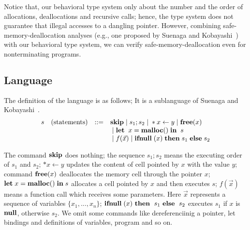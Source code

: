 \documentclass{sigplanconf}
\begin{document}
Notice that, our behavioral type system only about the number and the
order of allocations, deallocations and recursive calls; hence, the
type system does not guarantee that illegal accesses to a dangling
pointer.  However, combining safe-memory-deallocation analyses (e.g.,
one proposed by Suenaga and
Kobayashi~\cite{DBLP:conf/aplas/SuenagaK09}) with our behavioral type
system, we can verify safe-memory-deallocation even for nonterminating
programs.

\subsection{Language}
The definition of the language is as follows; It
is a sublanguage of Suenaga and Kobayashi~\cite{DBLP:conf/aplas/SuenagaK09}.
\[
\begin{array}{rlcl}
  s & (\mbox{statements})&::=&\mathbf{skip} \;|\; s_{1};s_{2} \;|\; *x \leftarrow y \;|\; \mathbf{free} (x) \\
  & & & \;|\; \mathbf{let}\;\; x = \mathbf{malloc()} \; \mathbf{in}\; \; s  \\
  & &  & \;|\; f(\vec{x}) \;|\; \mathbf{ifnull}\;(x) \; \mathbf{then}\; s_{1}\; \mathbf{else}\; s_{2} \\
\end{array}
\]


The command $\mathbf{skip}$ does nothing; the sequence $s_{1};s_{2}$ means the
executing order of $s_{1}$ and $s_{2}$; \(*x \leftarrow y\) updates
the content of cell pointed by \(x\) with the value \(y\); command
$\mathbf{free}(x)$ deallocates the memory cell through the pointer $x$;
\(\mathbf{let}\; x = \mathbf{malloc()} \; \mathbf{in}\; s\) allocates a cell pointed by \(x\) and
then executes \(s\); $f(\vec{x})$ means a function call which receives
some parameters. Here $\vec{x}$ represents a sequence of variables
\(\{x_1,...,x_n\}\); \(\mathbf{ifnull}\;(x)\ \mathbf{then}\;\ s_1\ \mathbf{else}\;\ s_2\) executes
\(s_1\) if \(x\) is \(\mathbf{null}\), otherwise \(s_2\). We omit some
commands like dereferenciinig a pointer, let bindings and definitions
of variables, program and so on.
\end{document}
